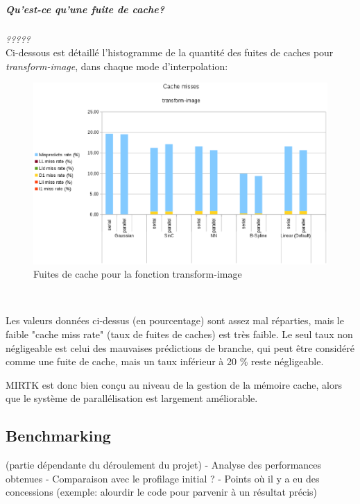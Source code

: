 \documentclass[10pt]{report}
\begin{document}
		\subparagraph{Qu'est-ce qu'une fuite de cache?}
		\textit{?????}\\
		Ci-dessous est détaillé l'histogramme de la quantité des fuites de caches pour \textit{transform-image}, dans chaque mode d'interpolation:
			\begin{figure}[h!]
				\begin{center}
					\includegraphics[width=15cm]{Reports/figures/cache_misses_transform_image.eps}
				\end{center}	
				\caption{Fuites de cache pour la fonction transform-image}
				\label{Fuites de cache pour la fonction transform-image}
			\end{figure}~\par
		Les valeurs données ci-dessus (en pourcentage) sont assez mal réparties, mais le faible "cache miss rate" (taux de fuites de caches) est très faible. Le seul taux non négligeable est celui des mauvaises prédictions de branche, qui peut être considéré comme une fuite de cache, mais un taux inférieur à 20 \% reste négligeable. 
		~\par
		MIRTK est donc bien conçu au niveau de la gestion de la mémoire cache, alors que le système de parallélisation est largement améliorable.


	\subsection{Benchmarking}
	(partie dépendante du déroulement du projet)\newline
	- Analyse des performances obtenues \newline
	- Comparaison avec le profilage initial ? \newline
	- Points où il y a eu des concessions (exemple: alourdir le code pour parvenir à un résultat précis)
	
\end{document}
